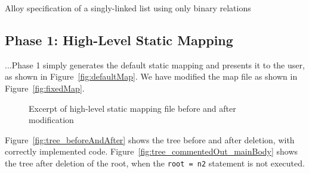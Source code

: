     \begin{Listing}[H]
    \caption{Alloy specification of a singly-linked list using only binary relations}
    \label{list:SimpleList1}
    \end{Listing}


\subsection{Phase 1: High-Level Static Mapping}\label{sec:phase1}

    ...Phase 1 simply generates the default static
    mapping and presents it to the user, as shown in Figure~\vref{fig:defaultMap}.  We
    have modified the map file as shown in Figure~\vref{fig:fixedMap}.

    \begin{figure}[H]
    \begin{singlespacing}
    \centering
    \caption[Excerpt of high-level static mapping file]{Excerpt of high-level static
    mapping file before and after modification}
    \end{singlespacing}
    \end{figure}



    Figure~\vref{fig:tree_beforeAndAfter} shows the tree
    before and after deletion, with correctly implemented code.
    Figure~\vref{fig:tree_commentedOut_mainBody} shows the tree after deletion of the
    root, when the \texttt{root = n2} statement is not executed.

